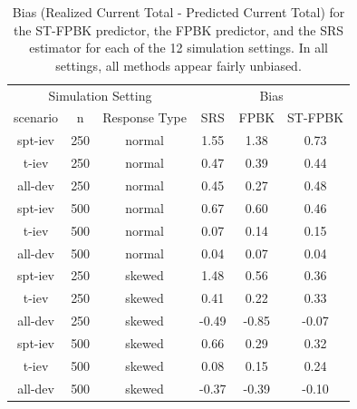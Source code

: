 \documentclass[smallextended]{svjour3}       %
\begin{document}
\begin{table}[H]

\caption{\label{tab:simbiastab}Bias (Realized Current Total - Predicted Current Total) for the ST-FPBK predictor, the FPBK predictor, and the SRS estimator for each of the 12 simulation settings. In all settings, all methods appear fairly unbiased.}
\centering
\begin{tabular}[t]{cccccc}
\toprule
\multicolumn{3}{c}{Simulation Setting} & \multicolumn{3}{c}{Bias} \\
\cmidrule(l{3pt}r{3pt}){1-3} \cmidrule(l{3pt}r{3pt}){4-6}
scenario & n & Response Type & SRS & FPBK & ST-FPBK\\
\midrule
spt-iev & 250 & normal & 1.55 & 1.38 & 0.73\\
t-iev & 250 & normal & 0.47 & 0.39 & 0.44\\
all-dev & 250 & normal & 0.45 & 0.27 & 0.48\\
\midrule
spt-iev & 500 & normal & 0.67 & 0.60 & 0.46\\
t-iev & 500 & normal & 0.07 & 0.14 & 0.15\\
all-dev & 500 & normal & 0.04 & 0.07 & 0.04\\
\midrule
spt-iev & 250 & skewed & 1.48 & 0.56 & 0.36\\
t-iev & 250 & skewed & 0.41 & 0.22 & 0.33\\
all-dev & 250 & skewed & -0.49 & -0.85 & -0.07\\
\midrule
spt-iev & 500 & skewed & 0.66 & 0.29 & 0.32\\
t-iev & 500 & skewed & 0.08 & 0.15 & 0.24\\
all-dev & 500 & skewed & -0.37 & -0.39 & -0.10\\
\bottomrule
\end{tabular}
\end{table}
\end{document}
